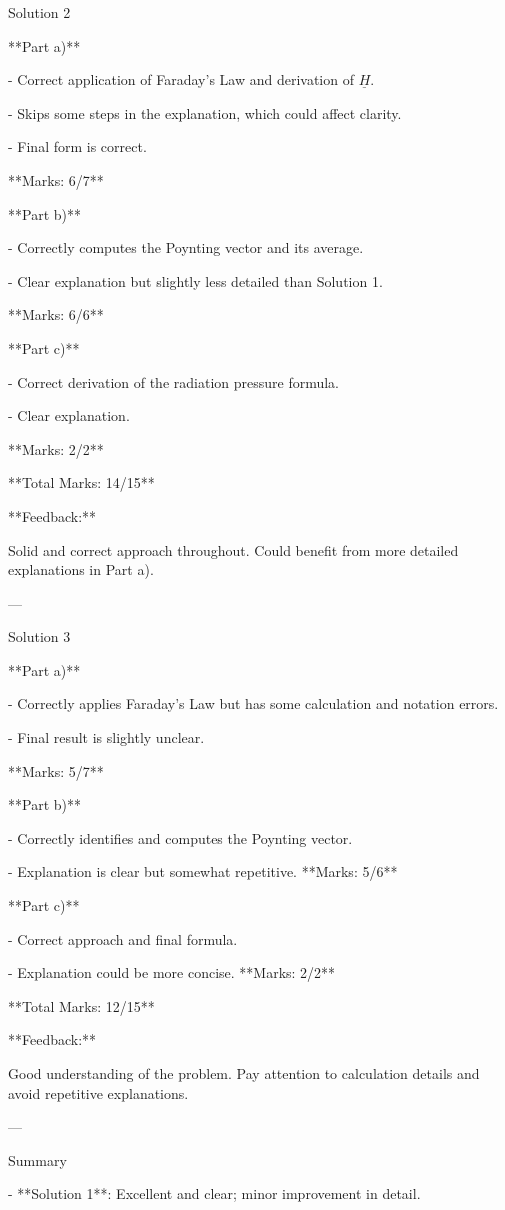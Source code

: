 \documentclass[a4paper,11pt]{article}
\begin{document}
Solution 2

**Part a)**

- Correct application of Faraday's Law and derivation of \(\underline{H}\).

- Skips some steps in the explanation, which could affect clarity.

- Final form is correct.

**Marks: 6/7**

**Part b)**

- Correctly computes the Poynting vector and its average.

- Clear explanation but slightly less detailed than Solution 1.

**Marks: 6/6**

**Part c)**

- Correct derivation of the radiation pressure formula.

- Clear explanation.

**Marks: 2/2**

**Total Marks: 14/15**

**Feedback:**

Solid and correct approach throughout. Could benefit from more detailed explanations in Part a).

---

Solution 3

**Part a)**

- Correctly applies Faraday's Law but has some calculation and notation errors.

- Final result is slightly unclear.

**Marks: 5/7**

**Part b)**

- Correctly identifies and computes the Poynting vector.

- Explanation is clear but somewhat repetitive.
**Marks: 5/6**

**Part c)**

- Correct approach and final formula.

- Explanation could be more concise.
**Marks: 2/2**

**Total Marks: 12/15**

**Feedback:**

Good understanding of the problem. Pay attention to calculation details and avoid repetitive explanations.

---

Summary

- **Solution 1**: Excellent and clear; minor improvement in detail.
\end{document}
